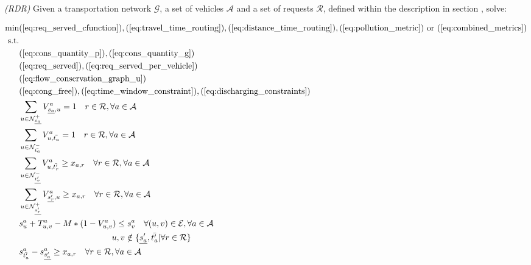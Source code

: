 \begin{algori}{\textit{(RDR)}}
	Given a transportation network $\mathcal{G}$, a set of vehicles $\mathcal{A}$ and a set of requests $\mathcal{R}$, defined within the description in section , solve:
	\label{RDR}
\end{algori}

\begin{align}
	\text{min}&  
		(\ref{eq:req_served_cfunction}),
		(\ref{eq:travel_time_routing}), (\ref{eq:distance_time_routing}), (\ref{eq:pollution_metric}) \text{ or } (\ref{eq:combined_metrics})
	\nonumber\\
	\text{s.t.} &\nonumber\\
	&(\ref{eq:cons_quantity_p}),(\ref{eq:cons_quantity_g})\nonumber\\	
	&(\ref{eq:req_served}),(\ref{eq:req_served_per_vehicle})\nonumber\\	
	&(\ref{eq:flow_conservation_graph_u})\nonumber\\%
	&(\ref{eq:cong_free}),(\ref{eq:time_window_constraint}),(\ref{eq:discharging_constraints})\nonumber\\
	&\sum_{ u \in \mathcal{N}^+_{\underline{s_a}} }V^a_{ \underline{s_a},u} = 1 \quad r \in \mathcal{R},  \forall a \in \mathcal{A} \label{eq:flow_cons_arrival_graph_u_d}\\
	&\sum_{u \in \mathcal{N}^-_{\bar{t_a}} } V^a_{u, \bar{t_a}} = 1 \quad r \in \mathcal{R},  \forall a \in \mathcal{A} \label{eq:flow_cons_departure_graph_u_d}\\
	&\sum_{u \in \mathcal{N}^-_{\underline{t'_r}} } V^a_{u, \bar{t'_r}} \ge x_{a,r} \quad  \forall r \in \mathcal{R}, \forall a \in \mathcal{A} \label{eq:must_arrive_dep}	\\
	&\sum_{u \in \mathcal{N}^+_{\underline{s'_r}} } V^a_{ \underline{s'_r}, u} \ge x_{a,r} \quad   \forall r \in \mathcal{R}, \forall a \in \mathcal{A}\label{eq:must_go_start}\\
	&s_{u}^a + T_{u,v}^a - M*(1-V^a_{u,v}) \leq s_{v}^a  \quad \forall (u,v) \in \mathcal{E},  \forall a \in \mathcal{A}\label{eq:relations_node_time_2}\\
	 &\quad \quad \quad\quad \quad \quad \quad \quad \quad \quad \quad u,v \notin \{\underline{s'_a},\bar{t'_a} | \forall r \in \mathcal{R}\}\nonumber\\
	 &s_{\bar{t'_a} }^a - s_{\underline{s'_a} }^a \ge x_{a,r}  \quad \forall r \in \mathcal{R}, \forall a \in \mathcal{A} \label{eq:req_order}
\end{align}

